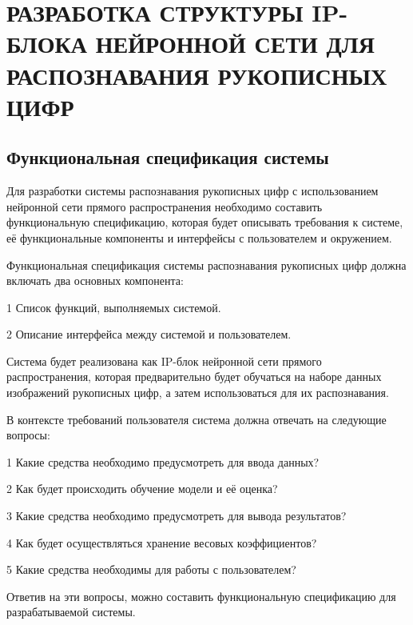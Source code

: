\chapter[Разработка структуры IP-блока нейронной сети для распознавания рукописных цифр]
{РАЗРАБОТКА СТРУКТУРЫ IP-БЛОКА НЕЙРОННОЙ СЕТИ ДЛЯ РАСПОЗНАВАНИЯ РУКОПИСНЫХ ЦИФР}

\section{Функциональная спецификация системы}\par
\hspace*{12.5 mm}Для разработки системы распознавания рукописных цифр с 
использованием нейронной сети прямого распространения необходимо составить 
функциональную спецификацию, которая будет описывать требования к системе, её 
функциональные компоненты и интерфейсы с пользователем и окружением.


Функциональная спецификация системы распознавания рукописных цифр должна 
включать два основных компонента:

  1 Список функций, выполняемых системой.
    
  2 Описание интерфейса между системой и пользователем.

Система будет реализована как IP-блок нейронной сети прямого распространения, 
которая предварительно будет обучаться на наборе данных изображений рукописных 
цифр, а затем использоваться для их распознавания.

В контексте требований пользователя система должна отвечать на следующие 
вопросы:

  1 Какие средства необходимо предусмотреть для ввода данных?

  2 Как будет происходить обучение модели и её оценка?

  3 Какие средства необходимо предусмотреть для вывода результатов?

  4 Как будет осуществляться хранение весовых коэффициентов?

  5 Какие средства необходимы для работы с пользователем?

Ответив на эти вопросы, можно составить функциональную спецификацию для 
разрабатываемой системы.

